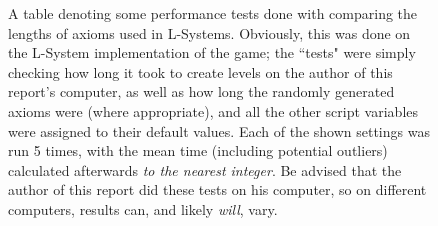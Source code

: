 \begin{figure}[H]
\begin{center}
{\begin{tabular}{|c|c|c|c|}
    \end{tabular}%
    }
    \end{center}
    \caption{A table denoting some performance tests done with comparing the lengths of axioms used in L-Systems. Obviously, this was done on the L-System implementation of the game; the ``tests" were simply checking how long it took to create levels on the author of this report's computer, as well as how long the randomly generated axioms were (where appropriate), and all the other script variables were assigned to their default values. Each of the shown settings was run 5 times, with the mean time (including potential outliers) calculated afterwards \textit{to the nearest integer}. Be advised that the author of this report did these tests on his computer, so on different computers, results can, and likely \textit{will}, vary.}
    \label{fig:table3}
\end{figure}